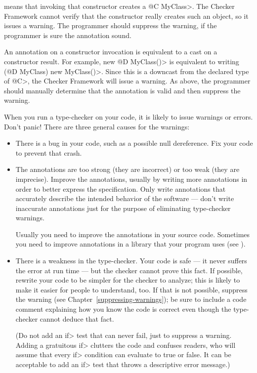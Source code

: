 \noindent
means that invoking that constructor creates a \<@C MyClass>.  The Checker
Framework cannot verify that the constructor really creates such an object,
so it issues a warning.  The programmer should suppress the warning, if the
programmer is sure the annotation sound.

An annotation on a constructor invocation is equivalent to a cast on a
constructor result.  For example, \<new @D MyClass()> is equivalent to writing
\<(@D MyClass) new MyClass()>.  Since this is a downcast from the declared
type of \<@C>, the Checker Framework will issue a warning.  As above, the
programmer should manually determine that the annotation is valid and then
suppress the warning.



When you run a type-checker on your code, it is likely to issue warnings or
errors.  Don't panic!  There are three general causes for the warnings:

\begin{itemize}
\item
  There is a bug in your code, such as a possible null dereference.  Fix
  your code to prevent that crash.

\item
  The annotations are too strong (they are incorrect) or too weak (they
  are imprecise).  Improve the
  annotations, usually by writing more annotations in order to better
  express the specification.
  Only write annotations that accurately describe the intended behavior of
  the software --- don't write inaccurate annotations just for the purpose
  of eliminating type-checker warnings.

  Usually you need to improve the annotations in your source code.
  Sometimes you need to improve annotations in a library that your program
  uses (see ).

\item
  There is a weakness in the type-checker.  Your code is safe --- it never
  suffers the error at run time --- but the checker cannot prove this fact.
  If possible, rewrite your code to be simpler for the checker to analyze;
  this is likely to make it easier for people to understand, too.
  If that is not possible, suppress the warning (see
  Chapter~\ref{suppressing-warnings}); be sure to include a code
  comment explaining how you know the code is correct even though the
  type-checker cannot deduce that fact.

  (Do not add an \<if> test that can never fail, just to suppress a
  warning.  Adding a gratuitous \<if> clutters the code and confuses
  readers, who will assume that every \<if> condition can evaluate to true
  or false.  It can be acceptable to add an \<if> test that throws a
  descriptive error message.)
\end{itemize}

